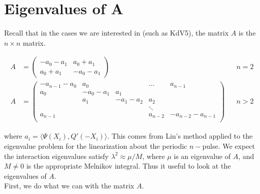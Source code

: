 \documentclass[12pt]{article}
\begin{document}
\section{Eigenvalues of A}

Recall that in the cases we are interested in (such as KdV5), the matrix $A$ is the $n \times n$ matrix.

\begin{align*}
A &= \begin{pmatrix}
-a_0 -a_1 & a_0 + a_1 \\
a_0 + a_1 & -a_0 - a_1
\end{pmatrix} && n = 2 \\
A &= \begin{pmatrix}
-a_{n-1} - a_0 & a_0 & & \dots & a_{n-1}\\
a_0 & -a_0 - a_1 &  a_1 \\
& a_1 & -a_1 - a_2 &  a_2 \\
& & & \ddots & \\
a_{n-1} & & & a_{n-2} & -a_{n-2} - a_{n-1} \\
\end{pmatrix} && n > 2
\end{align*}

where $a_i = \langle \Psi(X_i), Q'(-X_i) \rangle$. This comes from Lin's method applied to the eigenvalue problem for the linearization about the periodic $n-$pulse. We expect the interaction eigenvalues satisfy $\lambda^2 \approx \mu / M$, where $\mu$ is an eigenvalue of $A$, and $M \neq 0$ is the appropriate Melnikov integral. Thus it useful to look at the eigenvalues of $A$. \\

First, we do what we can with the matrix $A$.
\end{document}
